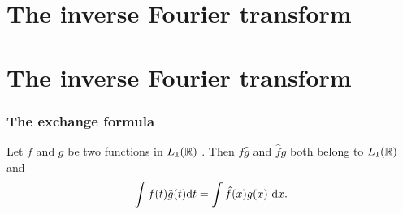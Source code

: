 %
\section{The inverse Fourier transform}
\section{The inverse Fourier transform}
\begin{frame}
\frametitle{The exchange formula}
\begin{theorem}
 Let $f$ and $g$  be two functions in $L_1(\mathbb{R})$ . Then $f\hat{g}$
and $\hat{f}g$ both belong to $L_1(\mathbb{R})$ and
$$
\int f(t)\hat{g}(t)\rmd t=\int\hat{f}(x)g(x)\ \rmd x.
$$
\end{theorem}
\end{frame}


